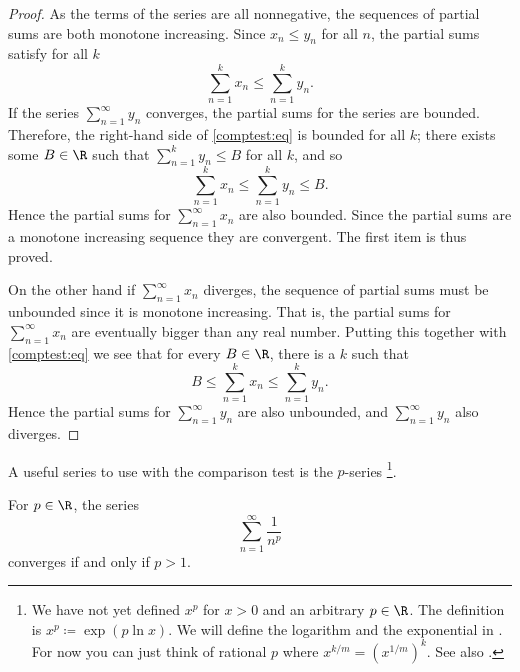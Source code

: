 \begin{proof}
As the terms of the series are all nonnegative, the sequences of
partial sums are both monotone increasing.
Since $x_n \leq y_n$ for all $n$, the partial sums
satisfy for all $k$
\begin{equation} \label{comptest:eq}
\sum_{n=1}^k x_n \leq \sum_{n=1}^k y_n .
\end{equation}
If the series $\sum_{n=1}^\infty y_n$ converges, the partial sums for the series
are bounded.  Therefore, the right-hand side of \eqref{comptest:eq}
is bounded for all $k$; there exists some $B \in \R$ such that
$\sum_{n=1}^k y_n \leq B$ for all $k$, and so
\begin{equation*}
\sum_{n=1}^k x_n \leq \sum_{n=1}^k y_n \leq B.
\end{equation*}
Hence the partial sums for $\sum_{n=1}^\infty x_n$
are also bounded.  Since the partial sums are a monotone increasing sequence
they are convergent.  The first item is thus proved.

On the other hand if $\sum_{n=1}^\infty x_n$ diverges, the sequence of partial sums
must be unbounded since it is monotone increasing.  That is, the partial
sums for $\sum_{n=1}^\infty x_n$ are eventually bigger than any real number.  Putting this
together with \eqref{comptest:eq} we see that for every $B \in
\R$, there is a $k$ such that 
\begin{equation*}
B \leq \sum_{n=1}^k x_n \leq \sum_{n=1}^k y_n .
\end{equation*}
Hence the partial sums for $\sum_{n=1}^\infty y_n$ are also unbounded, and
$\sum_{n=1}^\infty y_n$ also diverges.
\end{proof}

A useful series to use with the comparison test is the
$p$-series%
\footnote{We have not yet defined $x^p$ for $x > 0$ and
an arbitrary $p \in \R$.  The definition is $x^p \coloneqq \exp ( p \ln x )$.
We will define the logarithm and the exponential in .
For now you can just think of rational $p$
where $x^{k/m} = {(x^{1/m})}^{k}$.  See also .}.

\begin{prop}%
For $p \in \R$, 
the series
\begin{equation*}
\sum_{n=1}^\infty \frac{1}{n^p}
\end{equation*}
converges if and only if $p > 1$.
\end{prop}

